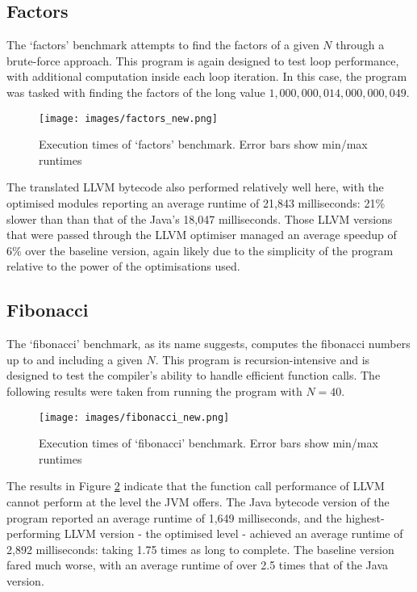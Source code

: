 \subsection*{Factors}

The `factors' benchmark attempts to find the factors of a given $N$ through a brute-force approach. This program is again designed to test loop performance, with additional computation inside each loop iteration. In this case, the program was tasked with finding the factors of the long value $1,000,000,014,000,000,049$.

\begin{figure}[h!]
    \centering
    \texttt{[image: images/factors\_new.png]}
    \caption[Execution times of `factors' benchmark]{Execution times of `factors' benchmark. Error bars show min/max runtimes}
    \label{fig:res_factors}
\end{figure}

The translated LLVM bytecode also performed relatively well here, with the optimised modules reporting an average runtime of 21,843 milliseconds: 21\% slower than than that of the Java's 18,047 milliseconds. Those LLVM versions that were passed through the LLVM optimiser managed an average speedup of 6\% over the baseline version, again likely due to the simplicity of the program relative to the power of the optimisations used.


\subsection*{Fibonacci}

The `fibonacci' benchmark, as its name suggests, computes the fibonacci numbers up to and including a given $N$. This program is recursion-intensive and is designed to test the compiler's ability to handle efficient function calls. The following results were taken from running the program with $N = 40$.

\begin{figure}[h!]
    \centering
    \texttt{[image: images/fibonacci\_new.png]}
    \caption[Execution times of `fibonacci' benchmark]{Execution times of `fibonacci' benchmark. Error bars show min/max runtimes}
    \label{fig:res_fibonacci}
\end{figure}

The results in Figure \ref{fig:res_fibonacci} indicate that the function call performance of LLVM cannot perform at the level the JVM offers. The Java bytecode version of the program reported an average runtime of 1,649 milliseconds, and the highest-performing LLVM version - the optimised level - achieved an average runtime of 2,892 milliseconds: taking 1.75 times as long to complete. The baseline version fared much worse, with an average runtime of over 2.5 times that of the Java version.


